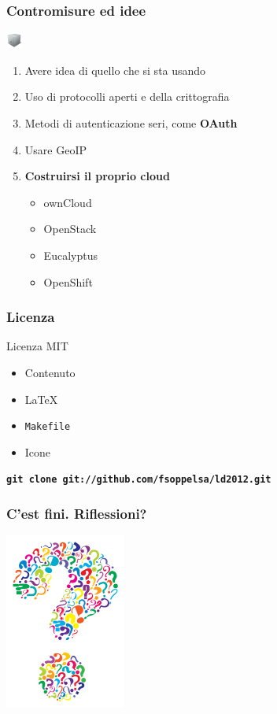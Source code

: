 \documentclass[xcolor=svgnames,handout]{beamer}
\begin{document}
\begin{frame}
	\frametitle{Contromisure ed idee}

	\begin{block}{\includegraphics[width=20px]{img/safe.png}}
			\begin{enumerate}
					\item Avere idea di quello che si sta usando
						\pause
					\item Uso di protocolli aperti e della crittografia
						\pause
					\item Metodi di autenticazione seri, come {\bf OAuth}
						\pause
					\item Usare GeoIP
						\pause
					\item {\bf Costruirsi il proprio cloud}
						\pause
						\begin{itemize}
							\item ownCloud
								\pause
							\item OpenStack
								\pause
							\item Eucalyptus
								\pause
							\item OpenShift
						\end{itemize}
			\end{enumerate}
	\end{block}
\end{frame}

\begin{frame}
	\frametitle{Licenza}

	\begin{block}{Licenza MIT}
		\begin{itemize}
			\item Contenuto
			\item \LaTeX
			\item \texttt{Makefile}
			\item Icone
		\end{itemize}
	\end{block}

	\begin{center}
		{\bf \texttt{git clone git://github.com/fsoppelsa/ld2012.git}}
	\end{center}
\end{frame}

\begin{frame}
	\frametitle{C'est fini. Riflessioni?}

	\begin{center}
		\includegraphics[width=150px]{img/q.jpg}
	\end{center}
\end{frame}
\end{document}
